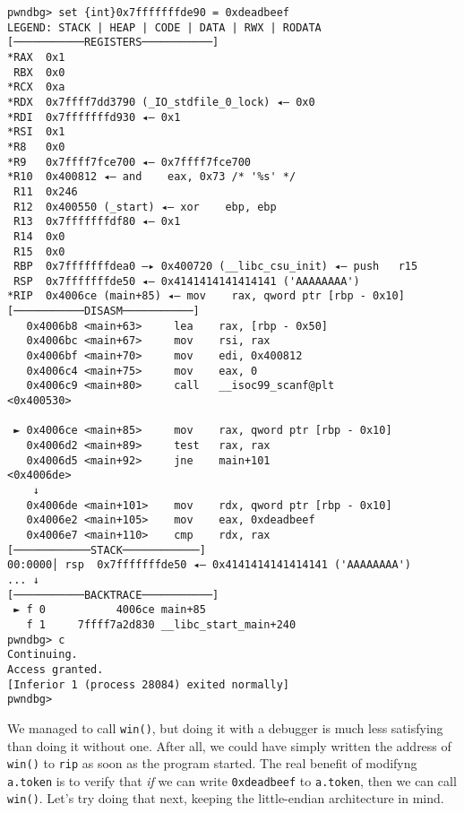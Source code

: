 \documentclass{article}
\begin{document}
\begin{lstlisting}
pwndbg> set {int}0x7fffffffde90 = 0xdeadbeef
LEGEND: STACK | HEAP | CODE | DATA | RWX | RODATA
[───────────REGISTERS───────────]
*RAX  0x1
 RBX  0x0
*RCX  0xa
*RDX  0x7ffff7dd3790 (_IO_stdfile_0_lock) ◂— 0x0
*RDI  0x7fffffffd930 ◂— 0x1
*RSI  0x1
*R8   0x0
*R9   0x7ffff7fce700 ◂— 0x7ffff7fce700
*R10  0x400812 ◂— and    eax, 0x73 /* '%s' */
 R11  0x246
 R12  0x400550 (_start) ◂— xor    ebp, ebp
 R13  0x7fffffffdf80 ◂— 0x1
 R14  0x0
 R15  0x0
 RBP  0x7fffffffdea0 —▸ 0x400720 (__libc_csu_init) ◂— push   r15
 RSP  0x7fffffffde50 ◂— 0x4141414141414141 ('AAAAAAAA')
*RIP  0x4006ce (main+85) ◂— mov    rax, qword ptr [rbp - 0x10]
[───────────DISASM───────────]
   0x4006b8 <main+63>     lea    rax, [rbp - 0x50]
   0x4006bc <main+67>     mov    rsi, rax
   0x4006bf <main+70>     mov    edi, 0x400812
   0x4006c4 <main+75>     mov    eax, 0
   0x4006c9 <main+80>     call   __isoc99_scanf@plt            <0x400530>
 
 ► 0x4006ce <main+85>     mov    rax, qword ptr [rbp - 0x10]
   0x4006d2 <main+89>     test   rax, rax
   0x4006d5 <main+92>     jne    main+101                      <0x4006de>
    ↓
   0x4006de <main+101>    mov    rdx, qword ptr [rbp - 0x10]
   0x4006e2 <main+105>    mov    eax, 0xdeadbeef
   0x4006e7 <main+110>    cmp    rdx, rax
[────────────STACK────────────]
00:0000│ rsp  0x7fffffffde50 ◂— 0x4141414141414141 ('AAAAAAAA')
... ↓
[───────────BACKTRACE───────────]
 ► f 0           4006ce main+85
   f 1     7ffff7a2d830 __libc_start_main+240
pwndbg> c
Continuing.
Access granted.
[Inferior 1 (process 28084) exited normally]
pwndbg> 
\end{lstlisting}

We managed to call \texttt{win()}, but doing it with a debugger is much less
satisfying than doing it without one. After all, we could have simply written
the address of \texttt{win()} to \texttt{rip} as soon as the program started.
The real benefit of modifyng \texttt{a.token} is to verify that \emph{if} we can
write \texttt{0xdeadbeef} to \texttt{a.token}, then we can call \texttt{win()}.
Let's try doing that next, keeping the little-endian architecture in mind.
\end{document}
